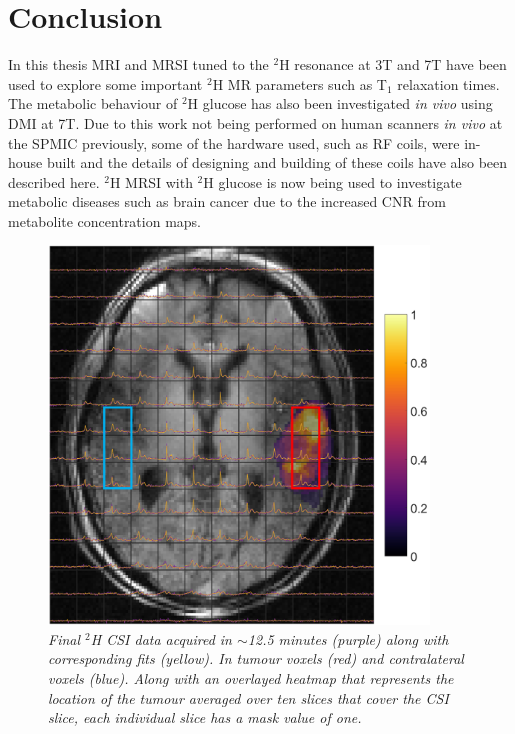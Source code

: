 \chapter{Conclusion}
\label{section:Conclusion}

In this thesis \ac{MRI} and \ac{MRSI} tuned to the $^2$H resonance at 3T and 7T have been used to explore some important $^2$H MR parameters such as T$_1$ relaxation times. The metabolic behaviour of $^2$H glucose has also been investigated \textit{in vivo} using \ac{DMI} at 7T. Due to this work not being performed on human scanners \textit{in vivo} at the \ac{SPMIC} previously, some of the hardware used, such as \ac{RF} coils, were in-house built and the details of designing and building of these coils have also been described here. $^2$H MRSI with $^2$H glucose is now being used to investigate metabolic diseases such as brain cancer due to the increased \ac{CNR} from metabolite concentration maps. 

\begin{figure}
    \centering
    \includegraphics[width = 0.9\textwidth]{Figures/Conclusion/CSI.png}
    \caption{\textit{Final $^2$H CSI data acquired in $\sim$12.5 minutes (purple) along with corresponding fits (yellow). In tumour voxels (red) and contralateral voxels (blue). Along with an overlayed heatmap that represents the location of the tumour averaged over ten slices that cover the \ac{CSI} slice, each individual slice has a mask value of one.}}
    \label{fig:Conc:CSI}
\end{figure}

